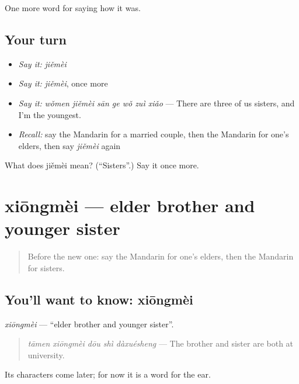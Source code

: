 \begin{grammarlens}[title={What you've built}]
One more word for saying how it was.
\end{grammarlens}

\subsection*{Your turn}
\begin{itemize}
\raggedright
  \item \emph{Say it:} \emph{jiěmèi}
  \item \emph{Say it:} \emph{jiěmèi}, once more
  \item \emph{Say it:} \emph{wǒmen jiěmèi sān ge wǒ zuì xiǎo} — There are three of us sisters, and I'm the youngest.
  \item \emph{Recall:} say the Mandarin for a married couple, then the Mandarin for one's elders, then say \emph{jiěmèi} again
\end{itemize}

\begin{tcolorbox}[breakable,colback=teal!4,colframe=teal!35!black,title={Before you move on}]
What does jiěmèi mean? (\textquotedblleft{}Sisters\textquotedblright{}.) Say it once more.
\end{tcolorbox}
\section[xiōngmèi]{xiōngmèi — elder brother and younger sister}

\label{lesson:ZH-C508-xiongmei}



\begin{quote}
Before the new one: say the Mandarin for one's elders, then the Mandarin for sisters.
\end{quote}

\subsection*{You'll want to know: xiōngmèi}
\emph{xiōngmèi} — \textquotedblleft{}elder brother and younger sister\textquotedblright{}.

\begin{quote}
\emph{tāmen xiōngmèi dōu shì dàxuésheng} — The brother and sister are both at university.
\end{quote}

Its characters come later; for now it is a word for the ear.

